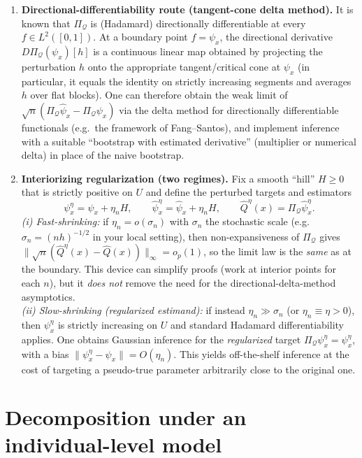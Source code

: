 \documentclass[12pt]{article}
\begin{document}
\begin{enumerate}
\item \textbf{Directional-differentiability route (tangent-cone delta method).} 
It is known that \(\Pi_{\mathcal Q}\) is (Hadamard) directionally differentiable at every \(f\in L^2([0,1])\). At a boundary point \(f=\psi_x\), the directional derivative \(D\Pi_{\mathcal Q}(\psi_x)[h]\) is a continuous linear map obtained by projecting the perturbation \(h\) onto the appropriate tangent/critical cone at \(\psi_x\) (in particular, it equals the identity on strictly increasing segments and averages $h$ over flat blocks). One can therefore obtain the weak limit of
\(\sqrt{n}(\Pi_{\mathcal Q}\hat\psi_x-\Pi_{\mathcal Q}\psi_x)\)
via the delta method for directionally differentiable functionals (e.g.\ the framework of Fang--Santos), and implement inference with a suitable ``bootstrap with estimated derivative'' (multiplier or numerical delta) in place of the naive bootstrap.

\item \textbf{Interiorizing regularization (two regimes).} 
Fix a smooth ``hill'' \(H\ge 0\) that is strictly positive on \(U\) and define the perturbed targets and estimators
\[
\psi_x^\eta=\psi_x+\eta_n H,\qquad \hat\psi_x^\eta=\hat\psi_x+\eta_n H,\qquad 
\hat Q^\eta(x)=\Pi_{\mathcal Q}\hat\psi_x^\eta.
\]
\emph{(i) Fast-shrinking:} if \(\eta_n=o(\sigma_n)\) with \(\sigma_n\) the stochastic scale (e.g.\ \(\sigma_n=(nh)^{-1/2}\) in your local setting), then non-expansiveness of \(\Pi_{\mathcal Q}\) gives
\(\|\sqrt{n}(\hat Q^\eta(x)-\hat Q(x))\|_\infty= o_p(1)\),
so the limit law is the \emph{same} as at the boundary. This device can simplify proofs (work at interior points for each \(n\)), but it \emph{does not} remove the need for the directional-delta-method asymptotics.\\
\emph{(ii) Slow-shrinking (regularized estimand):} if instead \(\eta_n\gg \sigma_n\) (or \(\eta_n\equiv\eta>0\)), then \(\psi_x^\eta\) is strictly increasing on \(U\) and standard Hadamard differentiability applies. One obtains Gaussian inference for the \emph{regularized} target \(\Pi_{\mathcal Q}\psi_x^\eta=\psi_x^\eta\), with a bias \(\|\psi_x^\eta-\psi_x\|=O(\eta_n)\). This yields off-the-shelf inference at the cost of targeting a pseudo-true parameter arbitrarily close to the original one.
\end{enumerate}




\section{Decomposition under an individual-level model}
\label{app:individual_decomposition}
\end{document}
